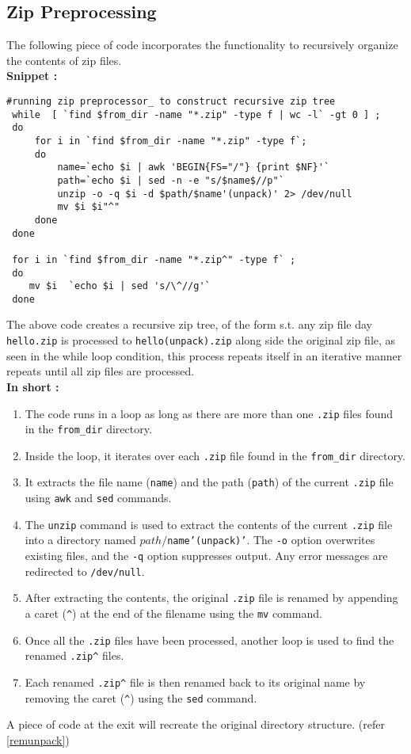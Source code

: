 \documentclass[12pt]{article}
\begin{document}
    \subsection{Zip Preprocessing}
    \begin{flushleft}
        The following piece of code incorporates the functionality to recursively organize the contents of zip files.\\
        \textbf{Snippet :}
        \begin{verbatim}
#running zip preprocessor_ to construct recursive zip tree
 while  [ `find $from_dir -name "*.zip" -type f | wc -l` -gt 0 ] ;
 do
     for i in `find $from_dir -name "*.zip" -type f`;
     do
         name=`echo $i | awk 'BEGIN{FS="/"} {print $NF}'`
         path=`echo $i | sed -n -e "s/$name$//p"`
         unzip -o -q $i -d $path/$name'(unpack)' 2> /dev/null
         mv $i $i"^"
     done
 done

 for i in `find $from_dir -name "*.zip^" -type f` ;
 do
    mv $i  `echo $i | sed 's/\^//g'`
 done
        \end{verbatim}
        The above code creates a recursive zip tree, of the form s.t. any zip file day \texttt{hello.zip} is processed to \texttt{hello(unpack).zip} along side the original zip file, as seen in the while loop condition, this process repeats itself in an iterative manner repeats until all zip files are processed.\\
        \textbf{In short :}\\
        \begin{enumerate}
        \item The code runs in a loop as long as there are more than one \texttt{.zip} files found in the \texttt{from\_dir} directory.
        \item Inside the loop, it iterates over each \texttt{.zip} file found in the \texttt{from\_dir} directory.
        \item It extracts the file name (\texttt{name}) and the path (\texttt{path}) of the current \texttt{.zip} file using \texttt{awk} and \texttt{sed} commands.
        \item The \texttt{unzip} command is used to extract the contents of the current \texttt{.zip} file into a directory named \texttt{$path/$name'(unpack)'}. The \texttt{-o} option overwrites existing files, and the \texttt{-q} option suppresses output. Any error messages are redirected to \texttt{/dev/null}.
        \item After extracting the contents, the original \texttt{.zip} file is renamed by appending a caret (\texttt{\^}) at the end of the filename using the \texttt{mv} command.
        \item Once all the \texttt{.zip} files have been processed, another loop is used to find the renamed \texttt{.zip\^} files.
        \item Each renamed \texttt{.zip\^} file is then renamed back to its original name by removing the caret (\texttt{\^}) using the \texttt{sed} command.
        \end{enumerate}
        A piece of code at the exit will recreate the original directory structure. (refer \ref{remunpack})
    \end{flushleft}
\end{document}
